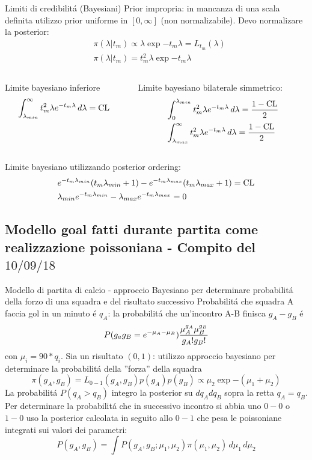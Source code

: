 \documentclass[asd-beamer.tex]{subfiles}
\begin{document}
\begin{frame}{Limiti di credibilit\'a (Bayesiani)}
Prior impropria: in mancanza di una scala definita utilizzo prior uniforme in $[0,\infty]$ (non normalizabile). Devo normalizare la posterior:
\begin{align*}
&\pi(\lambda|t_m)\propto \lambda\exp{-t_m\lambda}=L_{t_m}(\lambda)\\
&\pi(\lambda|t_m)=t_m^2\lambda\exp{-t_m\lambda}
\end{align*}
\begin{columns}[T]
	\begin{column}{0.5\textwidth}
Limite bayesiano inferiore
\begin{equation*}
\int_{\lambda_{min}}^{\infty}t_m^2\lambda e^{-t_m\lambda}\,d\lambda=\operatorname{CL}{}
\end{equation*}
	\end{column}
	\begin{column}{0.5\textwidth}
Limite bayesiano bilaterale simmetrico:
\begin{align*}
&\int_0^{\lambda_{min}}t_m^2\lambda e^{-t_m\lambda}\,d\lambda=\frac{1-\operatorname{CL}}{2}\\
&\int_{\lambda_{max}}^{\infty}t_m^2\lambda e^{-t_m\lambda}\,d\lambda=\frac{1-\operatorname{CL}}{2}
\end{align*}
\end{column}
\end{columns}
Limite bayesiano utilizzando posterior ordering:
\begin{align*}
&e^{-t_m\lambda_{min}}(t_m\lambda_{min}+1)-e^{-t_m\lambda_{max}}(t_m\lambda_{max}+1)=\operatorname{CL}\\
&\lambda_{min}e^{-t_m\lambda_{min}}-\lambda_{max}e^{-t_m\lambda_{max}}=0
\end{align*}
\end{frame}

\subsection{Modello goal fatti durante partita come realizzazione poissoniana - Compito del $10/09/18$}

\begin{frame}{Modello di partita di calcio - approccio Bayesiano per determinare probabilit\'a della forzo di una squadra e del risultato successivo}
Probabilit\'a che squadra A faccia gol in un minuto \'e $q_A$: la probabilit\'a che un'incontro A-B finisca $g_A-g_B$ \'e
\[P(g_ag_B=e^{-\mu_A-\mu_B})\frac{\mu_A^{g_A}\mu_B^{g_B}}{g_A!g_B!}\] con $\mu_i=90*q_i$.
Sia un risultato $(0,1)$: utilizzo approccio bayesiano per determinare la probabilit\'a della ''forza'' della squadra
\[\pi(g_A,g_B)=L_{0-1}(g_A,g_B)p(g_A)p(g_B)\propto\mu_2\exp{-(\mu_1+\mu_2)}\]
La probabilit\'a $P(q_A>q_B)$ integro la posterior su $dq_Adq_B$ sopra la retta $q_A=q_B$. Per determinare la probabilit\'a che in successivo incontro si abbia uno $0-0$ o $1-0$ uso la posterior calcolata in seguito allo $0-1$ che pesa le poissoniane integrati sui valori dei parametri:
\[P(g_A,g_B)=\int P(g_A,g_B;\mu_1,\mu_2)\pi(\mu_1,\mu_2)\,d\mu_1\,d\mu_2\]
\end{frame}
\end{document}
